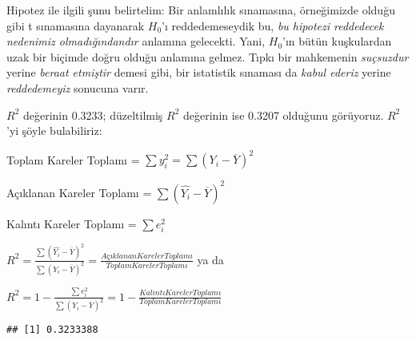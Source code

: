 \documentclass[
]{book}
\newenvironment{Shaded}{\begin{snugshade}}{\end{snugshade}}
\newcommand{\CommentTok}[1]{\textcolor[rgb]{0.56,0.35,0.01}{\textit{#1}}}
\newcommand{\DecValTok}[1]{\textcolor[rgb]{0.00,0.00,0.81}{#1}}
\newcommand{\KeywordTok}[1]{\textcolor[rgb]{0.13,0.29,0.53}{\textbf{#1}}}
\newcommand{\NormalTok}[1]{#1}
\newcommand{\OperatorTok}[1]{\textcolor[rgb]{0.81,0.36,0.00}{\textbf{#1}}}
\newcommand{\StringTok}[1]{\textcolor[rgb]{0.31,0.60,0.02}{#1}}
\begin{document}
Hipotez ile ilgili şunu belirtelim: Bir anlamlılık sınamasına, örneğimizde olduğu gibi t sınamasına dayanarak \(H_0\)'ı reddedemeseydik bu, \emph{bu hipotezi reddedecek nedenimiz olmadığındandır} anlamına gelecekti. Yani, \(H_0\)'ın bütün kuşkulardan uzak bir biçimde doğru olduğu anlamına gelmez. Tıpkı bir mahkemenin \emph{suçsuzdur} yerine \emph{beraat etmiştir} demesi gibi, bir istatistik sınaması da \emph{kabul ederiz} yerine \emph{reddedemeyiz} sonucuna varır.

\(R^2\) değerinin 0.3233; düzeltilmiş \(R^2\) değerinin ise 0.3207 olduğunu görüyoruz. \(R^2\)'yi şöyle bulabiliriz:

Toplam Kareler Toplamı = \(\sum y^2_i = \sum(Y_i - \overline{Y})^2\)

Açıklanan Kareler Toplamı = \(\sum(\hat{Y_i} - \overline{Y})^2\)

Kalıntı Kareler Toplamı = \(\sum e^2_i\)

\(R^2 = \frac{\sum(\hat{Y_i} - \overline{Y})^2}{\sum(Y_i - \overline{Y})^2} = \frac{Açıklanan Kareler Toplamı}{Toplam Kareler Toplamı}\) ya da

\(R^2 = 1 - \frac{\sum e^2_i}{\sum(Y_i - \overline{Y})^2} = 1 - \frac{Kalıntı Kareler Toplamı}{Toplam Kareler Toplamı}\)

\begin{Shaded}
\end{Shaded}

\begin{verbatim}
## [1] 0.3233388
\end{verbatim}
\end{document}
